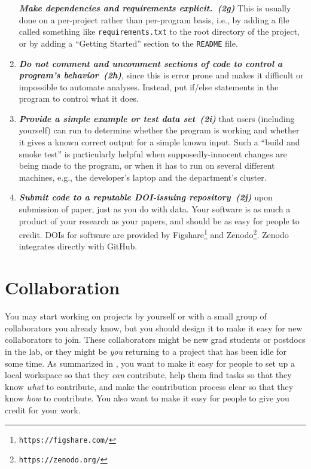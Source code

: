 \documentclass[10pt,letterpaper]{article}
\newcommand{\withurl}[2]{{#1}\footnote{{\texttt{#2}}}}
\newcommand{\practicesection}[2]{\section{#1}\label{#2}}
\newcommand{\practice}[2]{\textbf{\emph{{#2}~({#1})}}}
\begin{document}
\begin{enumerate}
  \practice{2g}{Make dependencies and requirements explicit.} This is
  usually done on a per-project rather than per-program basis, i.e.,
  by adding a file called something like \texttt{requirements.txt} to
  the root directory of the project, or by adding a ``Getting
  Started'' section to the \texttt{README} file.

\item

  \practice{2h}{Do not comment and uncomment sections of code to
  control a program's behavior}, since this is error prone and makes
  it difficult or impossible to automate analyses. Instead, put
  if/else statements in the program to control what it does.

\item

  \practice{2i}{Provide a simple example or test data set} that users
  (including yourself) can run to determine whether the program is
  working and whether it gives a known correct output for a simple
  known input. Such a ``build and smoke test'' is particularly helpful
  when supposedly-innocent changes are being made to the program, or
  when it has to run on several different machines, e.g., the
  developer's laptop and the department's cluster.

\item

  \practice{2j}{Submit code to a reputable DOI-issuing repository}
  upon submission of paper, just as you do with data. Your software is
  as much a product of your research as your papers, and should be as
  easy for people to credit. DOIs for software are provided by
  \withurl{Figshare}{https://figshare.com/} and
  \withurl{Zenodo}{https://zenodo.org/}. Zenodo integrates directly
  with GitHub.

\end{enumerate}

\practicesection{Collaboration}{sec:collaboration}

You may start working on projects by yourself or with a small group of
collaborators you already know, but you should design it to make it
easy for new collaborators to join. These collaborators might be new
grad students or postdocs in the lab, or they might be \emph{you}
returning to a project that has been idle for some time. As summarized
in \cite{steinmacher2015}, you want to make it easy for people to set
up a local workspace so that they \emph{can} contribute, help them
find tasks so that they know \emph{what} to contribute, and make the
contribution process clear so that they know \emph{how} to contribute.
You also want to make it easy for people to give you credit for your
work.
\end{document}
